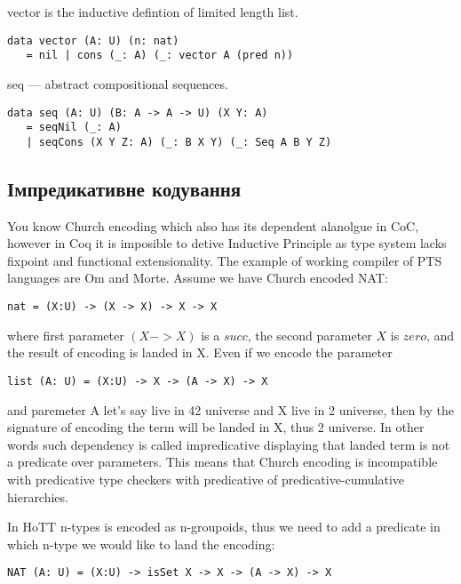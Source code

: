 vector is the inductive defintion of limited length list.
\begin{lstlisting}
data vector (A: U) (n: nat)
   = nil | cons (_: A) (_: vector A (pred n))
\end{lstlisting}

seq — abstract compositional sequences.
\begin{lstlisting}
data seq (A: U) (B: A -> A -> U) (X Y: A)
   = seqNil (_: A)
   | seqCons (X Y Z: A) (_: B X Y) (_: Seq A B Y Z)
\end{lstlisting}

\subsection{Імпредикативне кодування}

You know Church encoding which also has its dependent alanolgue in CoC, however
in Coq it is imposible to detive Inductive Principle as type system lacks fixpoint
and functional extensionality. The example of working compiler of PTS languages are Om and Morte.
Assume we have Church encoded NAT:

\begin{lstlisting}[mathescape=true]
nat = (X:U) -> (X -> X) -> X -> X
\end{lstlisting}

where first parameter $(X -> X)$ is a $succ$, the second parameter $X$ is $zero$,
and the result of encoding is landed in X. Even if we encode the parameter

\begin{lstlisting}[mathescape=true]
list (A: U) = (X:U) -> X -> (A -> X) -> X
\end{lstlisting}

and paremeter A let's say live in 42 universe and X live in 2 universe, then by
the signature of encoding the term will be landed in X, thus 2 universe. In other words
such dependency is called impredicative displaying that landed term is not a predicate over parameters.
This means that Church encoding is incompatible with predicative type checkers with predicative
of predicative-cumulative hierarchies.

In HoTT n-types is encoded as n-groupoids, thus we need to add a predicate in which n-type
we would like to land the encoding:

\begin{lstlisting}[mathescape=true]
NAT (A: U) = (X:U) -> isSet X -> X -> (A -> X) -> X
\end{lstlisting}

